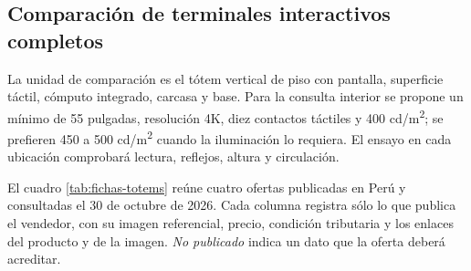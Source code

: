 \subsection{Comparación de terminales interactivos completos}
La unidad de comparación es el tótem vertical de piso con pantalla, superficie táctil, cómputo integrado, carcasa y base. Para la consulta interior se propone un mínimo de 55 pulgadas, resolución 4K, diez contactos táctiles y 400 cd/m\textsuperscript{2}; se prefieren 450 a 500 cd/m\textsuperscript{2} cuando la iluminación lo requiera. El ensayo en cada ubicación comprobará lectura, reflejos, altura y circulación.

El cuadro \ref{tab:fichas-totems} reúne cuatro ofertas publicadas en Perú y consultadas el 30 de octubre de 2026. Cada columna registra sólo lo que publica el vendedor, con su imagen referencial, precio, condición tributaria y los enlaces del producto y de la imagen. \emph{No publicado} indica un dato que la oferta deberá acreditar.

